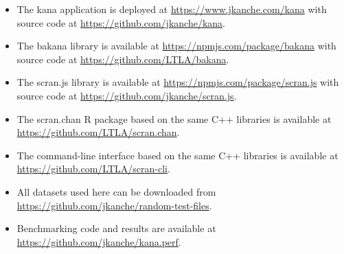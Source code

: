 \documentclass{article}
\begin{document}
\begin{itemize}
\item The kana application is deployed at \url{https://www.jkanche.com/kana} with source code at \url{https://github.com/jkanche/kana}.
\item The bakana library is available at \url{https://npmjs.com/package/bakana} with source code at \url{https://github.com/LTLA/bakana}.
\item The scran.js library is available at \url{https://npmjs.com/package/scran.js} with source code at \url{https://github.com/jkanche/scran.js}.
\item The scran.chan R package based on the same C++ libraries is available at \url{https://github.com/LTLA/scran.chan}.
\item The command-line interface based on the same C++ libraries is available at \url{https://github.com/LTLA/scran-cli}.
\item All datasets used here can be downloaded from \url{https://github.com/jkanche/random-test-files}.
\item Benchmarking code and results are available at \url{https://github.com/jkanche/kana.perf}.
\end{itemize}



\end{document}
